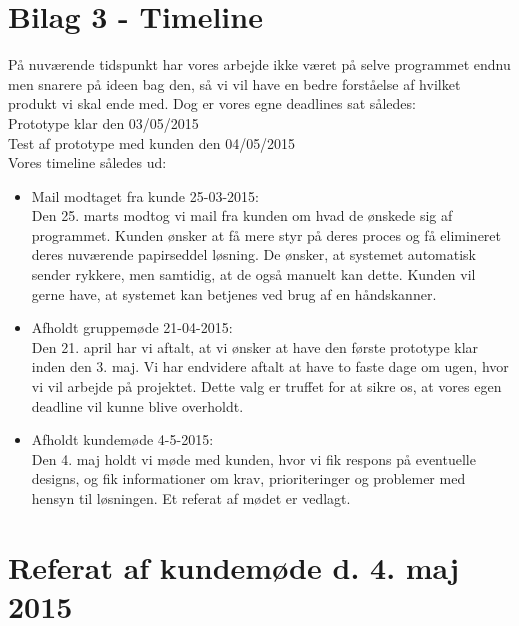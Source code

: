 \documentclass[a4paper]{article}
\begin{document}
\section{Bilag 3 - Timeline}
På nuværende tidspunkt har vores arbejde ikke været på selve programmet endnu men snarere på ideen bag den, så vi vil have en bedre forståelse af hvilket produkt vi skal ende med. Dog er vores egne deadlines sat således:\\
Prototype klar den 03/05/2015 \\
Test af prototype med kunden den 04/05/2015\\
Vores timeline således ud:
\begin{itemize}
	\item Mail modtaget fra kunde 25-03-2015:\\
Den 25. marts modtog vi mail fra kunden om hvad de ønskede sig af programmet. Kunden ønsker at få mere styr på deres proces og få elimineret deres nuværende papirseddel løsning. De ønsker, at systemet automatisk sender rykkere, men samtidig, at de også manuelt kan dette. Kunden vil gerne have, at systemet kan betjenes ved brug af en håndskanner.
	\item Afholdt gruppemøde 21-04-2015:\\
Den 21. april har vi aftalt, at vi ønsker at have den første prototype klar inden den 3. maj. Vi har endvidere aftalt at have to faste dage om ugen, hvor vi vil arbejde på projektet. Dette valg er truffet for at sikre os, at vores egen deadline vil kunne blive overholdt.
	\item Afholdt kundemøde 4-5-2015:\\
Den 4. maj holdt vi møde med kunden, hvor vi fik respons på eventuelle designs, og fik informationer om krav, prioriteringer og problemer med hensyn til løsningen. Et referat af mødet er vedlagt.
\end{itemize}
\pagebreak
\section{Referat af kundemøde d. 4. maj 2015}
\end{document}
